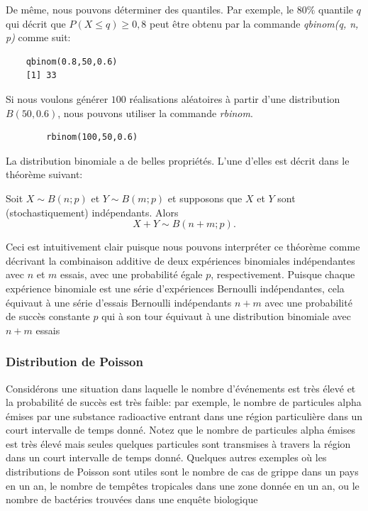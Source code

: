 {\begin{example}
De même, nous pouvons déterminer des quantiles. Par exemple, le $ 80\% $ quantile $ q $ qui décrit
    que $ P (X \leq q) ≥ 0,8 $ peut être obtenu par la commande \textit {qbinom(q, n, p)} comme suit:
\begin{verbatim}
    qbinom(0.8,50,0.6)
    [1] 33
\end{verbatim}
    Si nous voulons générer $ 100 $ réalisations aléatoires  à partir d'une distribution $ B (50,0.6) $,
    nous pouvons utiliser la commande \textit{rbinom}.
    \begin{verbatim}
        rbinom(100,50,0.6)
    \end{verbatim}
\end{example}
La distribution binomiale a de belles propriétés. L'une d'elles est décrit dans le théorème suivant:
\theoremstyle{theorem}
\begin{theorem}
    Soit $ X \sim B (n; p) $ et $ Y \sim B (m; p) $ et supposons que $ X $ et $ Y $ sont (stochastiquement)
    indépendants. Alors
    \begin{equation}
        X+Y\sim B(n+m;p).
    \end{equation}
\end{theorem}
Ceci est intuitivement clair puisque nous pouvons interpréter ce théorème comme décrivant la combinaison additive
de deux expériences binomiales indépendantes avec $ n$ et $m$ essais, avec une probabilité égale $ p $, respectivement.
Puisque chaque expérience binomiale est une série d'expériences Bernoulli indépendantes, cela équivaut à une série
d'essais Bernoulli indépendants $ n + m $ avec une probabilité de succès constante $ p $ qui à son tour équivaut à
une distribution binomiale avec  $ n + m $ essais

\subsubsection{Distribution de Poisson}
Considérons une situation dans laquelle le nombre d'événements est très élevé et la probabilité de succès est
très faible: par exemple, le nombre de particules alpha émises par une substance radioactive entrant dans une
région particulière dans un court intervalle de temps donné. Notez que le nombre de particules alpha émises est
très élevé mais seules quelques particules sont transmises à travers la région dans un court intervalle de temps
donné. Quelques autres exemples où les distributions de Poisson sont utiles sont le nombre de cas de grippe dans un
pays en un an, le nombre de tempêtes tropicales dans une zone donnée en un an, ou le nombre de bactéries trouvées dans
une enquête biologique

}
